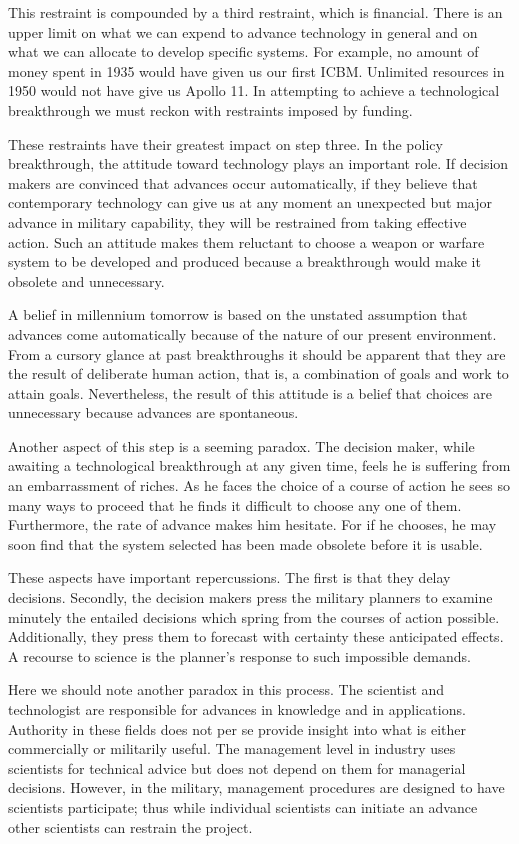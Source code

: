 This restraint is compounded by a third restraint, which is financial. There is an upper limit on what we can expend to advance technology in general and on what we can allocate to develop specific systems. For example, no amount of money spent in 1935 would have given us our first ICBM. Unlimited resources in 1950 would not have give us Apollo 11. In attempting to achieve a technological breakthrough we must reckon with restraints imposed by funding.

These restraints have their greatest impact on step three. In the policy breakthrough, the attitude toward technology plays an important role. If decision makers are convinced that advances occur automatically, if they believe that contemporary technology can give us at any moment an unexpected but major advance in military capability, they will be restrained from taking effective action. Such an attitude makes them reluctant to choose a weapon or warfare system to be developed and produced because a breakthrough would make it obsolete and unnecessary.

A belief in millennium tomorrow is based on the unstated assumption that advances come automatically because of the nature of our present environment. From a cursory glance at past breakthroughs it should be apparent that they are the result of deliberate human action, that is, a combination of goals and work to attain goals. Nevertheless, the result of this attitude is a belief that choices are unnecessary because advances are spontaneous.

Another aspect of this step is a seeming paradox. The decision maker, while awaiting a technological breakthrough at any given time, feels he is suffering from an embarrassment of riches. As he faces the choice of a course of action he sees so many ways to proceed that he finds it difficult to choose any one of them. Furthermore, the rate of advance makes him hesitate. For if he chooses, he may soon find that the system selected has been made obsolete before it is usable.

These aspects have important repercussions. The first is that they delay decisions. Secondly, the decision makers press the military planners to examine minutely the entailed decisions which spring from the courses of action possible. Additionally, they press them to forecast with certainty these anticipated effects. A recourse to science is the planner's response to such impossible demands.

Here we should note another paradox in this process. The scientist and technologist are responsible for advances in knowledge and in applications. Authority in these fields does not per se provide insight into what is either commercially or militarily useful. The management level in industry uses scientists for technical advice but does not depend on them for managerial decisions. However, in the military, management procedures are designed to have scientists participate; thus while individual scientists can initiate an advance other scientists can restrain the project.

